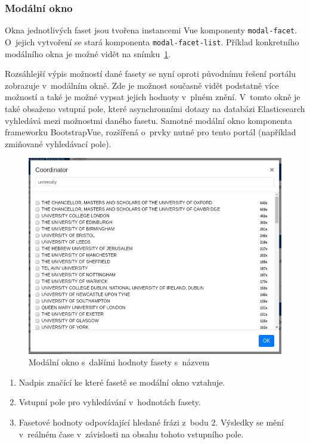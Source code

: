 \subsubsection*{Modální okno}
Okna jednotlivých faset jsou tvořena instancemi Vue komponenty \texttt{modal-facet}. O~jejich vytvoření se stará komponenta \texttt{modal-facet-list}. Příklad konkretního modálního okna je možné vidět na snímku~\ref{img:modal}.

Rozsáhlejší výpis možností dané fasety se nyní oproti původnímu řešení portálu zobrazuje v~modálním okně. Zde je možnost současně vidět podstatně více možností a také je možné vypsat jejich hodnoty v~plném znění. V~tomto okně je také obsaženo vstupní pole, které asynchronními dotazy na databázi Elasticsearch vyhledává mezi možnostmi daného fasetu. Samotné modální okno komponenta frameworku BootstrapVue, rozšířená o~prvky nutné pro tento portál (například zmiňované vyhledávací pole).

\begin{figure}[H]
	\centering
	\includegraphics[width=\textwidth]{obrazky-figures/my-modal.png}
	\caption{Modální okno s~dalšími hodnoty fasety s~názvem }
	\label{img:modal}
\end{figure}
\begin{enumerate}
    \item Nadpis značící ke které fasetě se modální okno vztahuje.
    \item Vstupní pole pro vyhledávání v~hodnotách fasety.
    \item Fasetové hodnoty odpovídající hledané frázi z~bodu 2. Výsledky se mění v~reálném čase v~závislosti na obsahu tohoto vstupního pole.
\end{enumerate}

